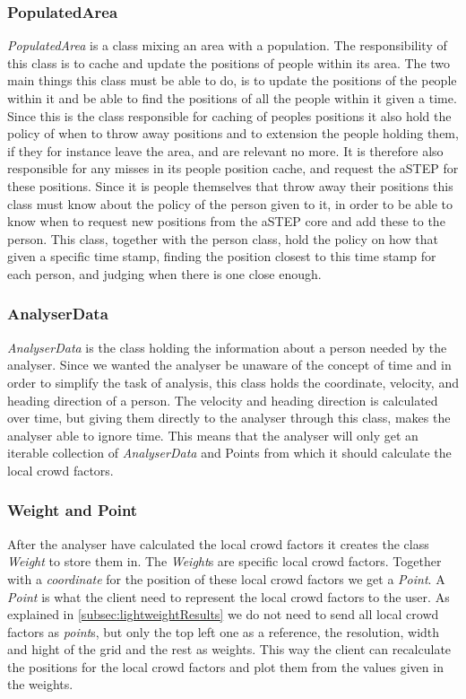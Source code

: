 \subsubsection{PopulatedArea}
\emph{PopulatedArea} is a class mixing an area with a population. The responsibility of this class is to cache and update the positions of people within its area. The two main things this class must be able to do, is to update the positions of the people within it and be able to find the positions of all the people within it given a time. Since this is the class responsible for caching of peoples positions it also hold the policy of when to throw away positions and to extension the people holding them, if they for instance leave the area, and are relevant no more. It is therefore also responsible for any misses in its people position cache, and request the aSTEP for these positions. Since it is people themselves that throw away their positions this class must know about the policy of the person given to it, in order to be able to know when to request new positions from the aSTEP core and add these to the person. This class, together with the person class, hold the policy on how that given a specific time stamp, finding the position closest to this time stamp for each person, and judging when there is one close enough.

\subsubsection{AnalyserData}
\emph{AnalyserData} is the class holding the information about a person needed by the analyser. Since we wanted the analyser be unaware of the concept of time and in order to simplify the task of analysis, this class holds the coordinate, velocity, and heading direction of a person. The velocity and heading direction is calculated over time, but giving them directly to the analyser through this class, makes the analyser able to ignore time. This means that the analyser will only get an iterable collection of \emph{AnalyserData} and Points from which it should calculate the local crowd factors. 

\subsubsection{Weight and Point}
After the analyser have calculated the local crowd factors it creates the class \emph{Weight} to store them in. The \emph{Weight}s are specific local crowd factors. Together with a \emph{coordinate} for the position of these local crowd factors we get a \emph{Point}. A \emph{Point} is what the client need to represent the local crowd factors to the user. As explained in \cref{subsec:lightweightResults} we do not need to send all local crowd factors as \emph{point}s, but only the top left one as a reference, the resolution, width and hight of the grid and the rest as weights. This way the client can recalculate the positions for the local crowd factors and plot them from the values given in the weights.

